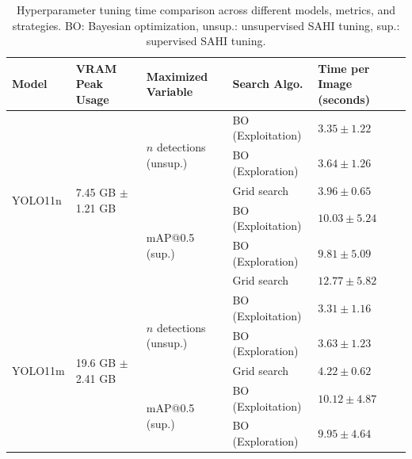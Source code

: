 \begin{table}[h]
\centering
\caption{Hyperparameter tuning time comparison across different models, metrics, and strategies. BO: Bayesian optimization, unsup.: unsupervised SAHI tuning, sup.: supervised SAHI tuning.}
\label{tab:hptuning_time}
\small
    \begin{tabular}{lllll}
    \toprule
    \textbf{Model} & \textbf{VRAM Peak Usage}&\textbf{Maximized Variable} & \textbf{Search Algo.} & \textbf{Time per Image (seconds)} \\
    \midrule
    \multirow{6}{*}{YOLO11n} & \multirow{6}{*}{7.45 GB $\pm$ 1.21 GB} & \multirow{3}{*}{$n$ detections (unsup.)}& BO (Exploitation) & $3.35 \pm 1.22$ \\
                            &                                         &                                          & BO (Exploration) & $3.64 \pm 1.26$ \\
                            &                                         &                                          & Grid search & $3.96 \pm 0.65$ \\
    \cmidrule{3-5}
                            &                                         & \multirow{3}{*}{mAP@0.5 (sup.)}         & BO (Exploitation) & $10.03 \pm 5.24$ \\
                            &                                         &                                          & BO (Exploration) & $9.81 \pm 5.09$ \\
                            &                                         &                                          & Grid search & $12.77 \pm 5.82$ \\
    \midrule
    \multirow{6}{*}{YOLO11m} & \multirow{6}{*}{19.6 GB $\pm$ 2.41 GB} & \multirow{3}{*}{$n$ detections (unsup.)}& BO (Exploitation) & $3.31 \pm 1.16$ \\
                            &                                       &                                            & BO (Exploration) & $3.63 \pm 1.23$ \\
                            &                                       &                                            & Grid search & $4.22 \pm 0.62$ \\
    \cmidrule{3-5}
                            &                                       &    \multirow{3}{*}{mAP@0.5 (sup.)}        & BO (Exploitation) & $10.12 \pm 4.87$ \\
                            &                                       &                                            & BO (Exploration) & $9.95 \pm 4.64$ \\

\end{tabular}
\end{table}
